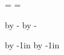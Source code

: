 








\headline={}
\footline={}


\hsize=210mm
\vsize=297mm


\advance\voffset by -\voffset
\advance\hoffset by -\hoffset

\advance\voffset by -1in
\advance\hoffset by -1in


\newskip\titleskip
\titleskip=8pt

\newskip\sourceskip
\sourceskip=8pt

\newskip\posttitleskip
\posttitleskip=0pt

